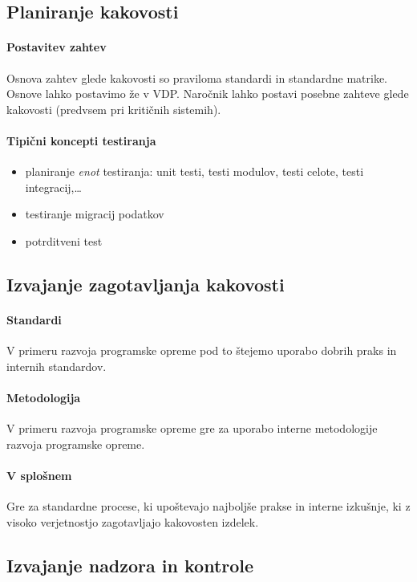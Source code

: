 \documentclass[a4paper,12pt]{report}
\begin{document}
      \subsection{Planiranje kakovosti}
         \paragraph{Postavitev zahtev} Osnova zahtev glede kakovosti so praviloma standardi in standardne matrike. Osnove lahko postavimo že v VDP. Naročnik lahko postavi posebne zahteve glede kakovosti (predvsem pri kritičnih sistemih).
         \paragraph{Tipični koncepti testiranja}
            \begin{itemize}
               \item planiranje \emph{enot} testiranja: unit testi, testi modulov, testi celote, testi integracij,\dots
               \item testiranje migracij podatkov
               \item potrditveni test
            \end{itemize}

      \subsection{Izvajanje zagotavljanja kakovosti}
         \paragraph{Standardi} V primeru razvoja programske opreme pod to štejemo uporabo dobrih praks in internih standardov.
         \paragraph{Metodologija} V primeru razvoja programske opreme gre za uporabo interne metodologije razvoja programske opreme.
         \paragraph{V splošnem} Gre za standardne procese, ki upoštevajo najboljše prakse in interne izkušnje, ki z visoko verjetnostjo zagotavljajo kakovosten izdelek.

      \subsection{Izvajanje nadzora in kontrole}
\end{document}
